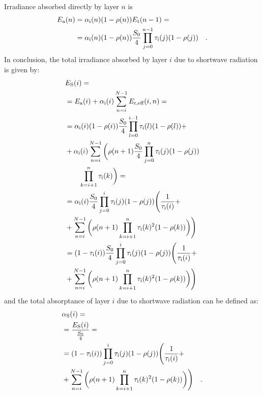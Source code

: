\documentclass[a4paper,10pt,twocolumn,\classoptions]{article}
\begin{document}
Irradiance absorbed directly by layer $n$ is
\begin{equation}
  \label{eq:irradiance_absorbed}
  \begin{split}
    E_\text{a}(n) & = \alpha_\text{i}(n) (1 - \rho(n)) E_\text{t}(n - 1)
    = \\
    & = \alpha_\text{i}(n) (1 - \rho(n)) \frac{S_0}{4} \prod_{j = 0}^{n - 1} \tau_\text{i}(j) (1 - \rho(j))
    \quad .
  \end{split}
\end{equation}
In conclusion, the total irradiance absorbed by layer $i$ due to shortwave radiation is given by:
\begin{equation}
  \label{eq:irradiance_shortwave_derivation}
  \begin{split}
    & E_\text{S}(i) = \\
    & = E_\text{a}(i) + \alpha_\text{i}(i) \sum_{n = i}^{N - 1} E_{\text{r},\text{eff}}(i, n) = \\
    & = \alpha_\text{i}(i) (1 - \rho(i)) \frac{S_0}{4} \prod_{l = 0}^{i - 1} \tau_\text{i}(l) (1 - \rho(l)) + \\
    & + \alpha_\text{i}(i) \sum_{n = i}^{N - 1} \bigg( \rho(n + 1) \frac{S_0}{4} \prod_{j = 0}^{n} \tau_\text{i}(j) (1 - \rho(j)) \\
    & \qquad \prod_{k = i + 1}^{n} \tau_\text{i}(k) \bigg) = \\
    & = \alpha_\text{i}(i) \frac{S_0}{4} \prod_{j = 0}^{i} \tau_\text{i}(j) (1 - \rho(j)) \Bigg( \frac{1}{\tau_\text{i}(i)} + \\
    & + \sum_{n = i}^{N - 1} \bigg( \rho(n + 1) \prod_{k = i + 1}^{n} \tau_\text{i}(k)^2 (1 - \rho(k)) \bigg) \Bigg) \\
    & = (1 - \tau_\text{i}(i)) \frac{S_0}{4} \prod_{j = 0}^{i} \tau_\text{i}(j) (1 - \rho(j)) \Bigg( \frac{1}{\tau_\text{i}(i)} + \\
    & + \sum_{n = i}^{N - 1} \bigg( \rho(n + 1) \prod_{k = i + 1}^{n} \tau_\text{i}(k)^2 (1 - \rho(k)) \bigg) \Bigg)
  \end{split}
\end{equation}
and the total absorptance of layer $i$ due to shortwave radiation can be defined as:
\begin{equation}
  \label{eq:absorbance_shortwave}
  \begin{split}
    & \alpha_\text{S}(i) = \\
    & = \frac{E_\text{S}(i)}{\frac{S_0}{4}} = \\
    & = (1 - \tau_\text{i}(i)) \prod_{j = 0}^{i} \tau_\text{i}(j) (1 - \rho(j)) \Bigg( \frac{1}{\tau_\text{i}(i)} + \\
    & + \sum_{n = i}^{N - 1} \bigg( \rho(n + 1) \prod_{k = i + 1}^{n} \tau_\text{i}(k)^2 (1 - \rho(k)) \bigg) \Bigg)
    \quad .
  \end{split}
\end{equation}
\end{document}
